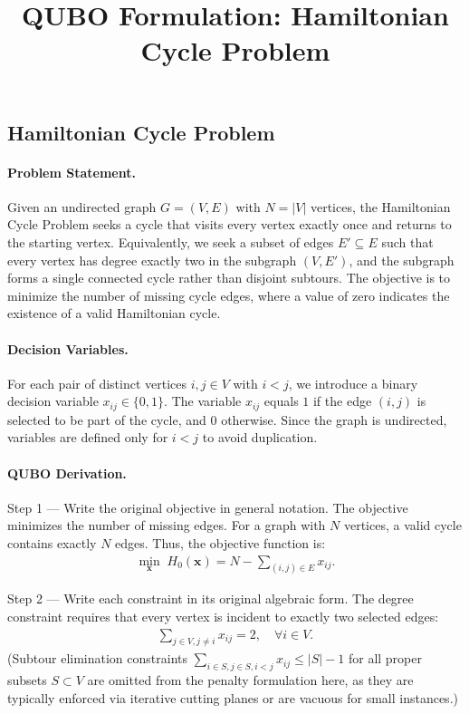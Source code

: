 \documentclass[12pt]{article}
\title{QUBO Formulation: Hamiltonian Cycle Problem}
\date{}
\begin{document}
\maketitle

\subsection*{Hamiltonian Cycle Problem}

\paragraph{Problem Statement.}
Given an undirected graph $G = (V, E)$ with $N = |V|$ vertices, the Hamiltonian Cycle Problem seeks a cycle that visits every vertex exactly once and returns to the starting vertex. Equivalently, we seek a subset of edges $E' \subseteq E$ such that every vertex has degree exactly two in the subgraph $(V, E')$, and the subgraph forms a single connected cycle rather than disjoint subtours. The objective is to minimize the number of missing cycle edges, where a value of zero indicates the existence of a valid Hamiltonian cycle.

\paragraph{Decision Variables.}
For each pair of distinct vertices $i, j \in V$ with $i < j$, we introduce a binary decision variable $x_{ij} \in \{0, 1\}$. The variable $x_{ij}$ equals $1$ if the edge $(i, j)$ is selected to be part of the cycle, and $0$ otherwise. Since the graph is undirected, variables are defined only for $i < j$ to avoid duplication.

\paragraph{QUBO Derivation.}
Step 1 --- Write the original objective in general notation. The objective minimizes the number of missing edges. For a graph with $N$ vertices, a valid cycle contains exactly $N$ edges. Thus, the objective function is:
\begin{align}
\min_{\mathbf{x}} \; H_0(\mathbf{x}) = N - \sum_{(i,j) \in E} x_{ij}.
\end{align}

Step 2 --- Write each constraint in its original algebraic form. The degree constraint requires that every vertex is incident to exactly two selected edges:
\begin{align}
\sum_{j \in V, j \neq i} x_{ij} = 2, \quad \forall i \in V.
\end{align}
(Subtour elimination constraints $\sum_{i \in S, j \in S, i < j} x_{ij} \le |S| - 1$ for all proper subsets $S \subset V$ are omitted from the penalty formulation here, as they are typically enforced via iterative cutting planes or are vacuous for small instances.)
\end{document}
